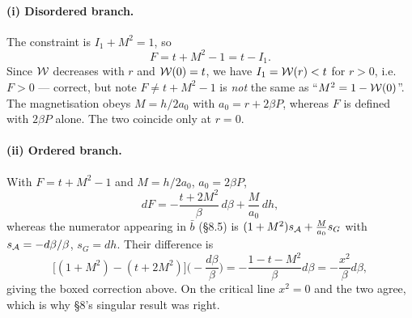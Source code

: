 \paragraph{(i) Disordered branch.} The constraint is $I_1+M^{2}=1$, so
\begin{equation}
  F=t+M^{2}-1=t-I_1 .
\end{equation}
Since $\mathcal{W}$ decreases with $r$ and $\mathcal{W}(0)=t$, we have $I_1=\mathcal{W}(r)<t$ for $r>0$, i.e.\ $F>0$
--- correct, but note $F\neq t+M^{2}-1$ is \emph{not} the same as ``$M^{2}=1-\mathcal{W}(0)$''. The
magnetisation obeys $M=h/2a_0$ with $a_0=r+2\beta P$, whereas $F$ is defined with $2\beta P$
alone. The two coincide only at $r=0$.

\paragraph{(ii) Ordered branch.} With $F=t+M^{2}-1$ and $M=h/2a_0$, $a_0=2\beta P$,
\begin{equation}
  dF=-\frac{t+2M^{2}}{\beta}\,d\beta+\frac{M}{a_0}\,dh ,
\end{equation}
whereas the numerator appearing in $\bar b$ (\S8.5) is
$(1+M^{2})s_{\mathcal{A}}+\tfrac{M}{a_0}s_G$ with $s_{\mathcal{A}}=-d\beta/\beta$, $s_G=dh$. Their difference
is
\begin{equation}
  \Big[(1+M^{2})-(t+2M^{2})\Big]\Big(-\frac{d\beta}{\beta}\Big)
  =-\frac{1-t-M^{2}}{\beta}d\beta=-\frac{x^{2}}{\beta}d\beta ,
\end{equation}
giving the boxed correction above. On the critical line $x^{2}=0$ and the two agree, which is
why \S8's singular result was right.

